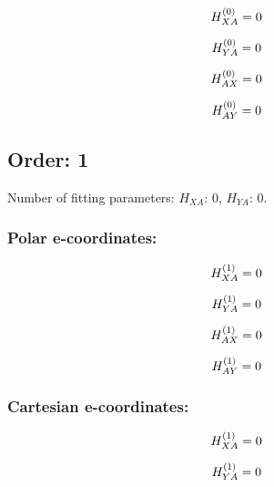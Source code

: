 \documentclass[fleqn]{article}
\begin{document}
\begin{dmath*}
H_{XA}^{(0)}=0\\
\end{dmath*}

\begin{dmath*}
H_{YA}^{(0)}=0\\
\end{dmath*}

\begin{dmath*}
H_{AX}^{(0)}=0\\
\end{dmath*}

\begin{dmath*}
H_{AY}^{(0)}=0\\
\end{dmath*}
\subsection{Order: 1}
Number of fitting parameters: $H_{XA}$: $0$, $H_{YA}$: $0$.
\subsubsection*{Polar e-coordinates:}

\begin{dmath*}
H_{XA}^{(1)}=0\\
\end{dmath*}

\begin{dmath*}
H_{YA}^{(1)}=0\\
\end{dmath*}

\begin{dmath*}
H_{AX}^{(1)}=0\\
\end{dmath*}

\begin{dmath*}
H_{AY}^{(1)}=0\\
\end{dmath*}
\subsubsection*{Cartesian e-coordinates:}

\begin{dmath*}
H_{XA}^{(1)}=0\\
\end{dmath*}

\begin{dmath*}
H_{YA}^{(1)}=0\\
\end{dmath*}
\end{document}
